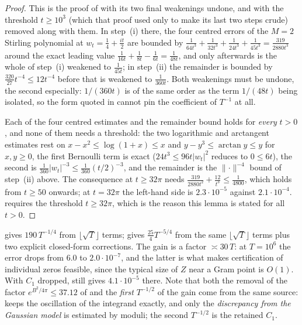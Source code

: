 \begin{proof}
\leanok
{}
This is the proof of  with its two final weakenings undone, and with the
threshold $t\ge10^{3}$ (which that proof used only to make its last two steps crude) removed
along with them.  In step~(i) there, the four centred errors of the $M=2$ Stirling polynomial at
$w_{t}=\tfrac14+\tfrac{it}2$ are bounded by
$\tfrac1{64t^{3}}+\tfrac1{32t^{3}}+\tfrac1{24t^{3}}+\tfrac1{45t^{3}}=\tfrac{319}{2880t^{3}}$
around the exact leading value $\tfrac1{16t}+\tfrac1{8t}-\tfrac1{6t}=\tfrac1{48t}$, and only
afterwards is the whole of step~(i) weakened to $\tfrac1{45t}$; in step~(ii) the remainder is
bounded by $\tfrac{320}{27}t^{-4}\le12t^{-4}$ before that is weakened to $\tfrac1{360t}$.  Both
weakenings must be undone, the second especially: $1/(360t)$ is of the same order as the term
$1/(48t)$ being isolated, so the form quoted in  cannot pin the coefficient of
$T^{-1}$ at all.

Each of the four centred estimates and the remainder bound holds for \emph{every} $t>0$, and none
of them needs a threshold: the two logarithmic and arctangent estimates rest on
$x-x^{2}\le\log(1+x)\le x$ and $y-y^{3}\le\arctan y\le y$ for $x,y\ge0$, the first Bernoulli term
is exact ($24t^{3}\le96t\lvert w_{t}\rvert^{2}$ reduces to $0\le6t$), the second is
$\tfrac1{360}\lvert w_{t}\rvert^{-3}\le\tfrac1{360}(t/2)^{-3}$, and the remainder is the
$\lVert\cdot\rVert^{-4}$ bound of step~(ii) above.  The consequence at $t\ge32\pi$ needs
$\tfrac{319}{2880t^{2}}+\tfrac{12}{t^{3}}\le\tfrac1{4800}$, which holds from $t\ge50$ onwards; at
$t=32\pi$ the left-hand side is $2.3\cdot10^{-5}$ against $2.1\cdot10^{-4}$.
 requires the threshold $t\ge32\pi$, which is the reason this lemma
is stated for all $t>0$.
\end{proof}

\begin{remark}
\label{rem:rsf_gain}
 gives $190\,T^{-1/4}$ from $\lfloor\sqrt T\rfloor$ terms;
 gives $\tfrac{25}4T^{-5/4}$ from the same $\lfloor\sqrt T\rfloor$
terms plus two explicit closed-form corrections.  The gain is a factor $\asymp30\,T$: at
$T=10^{6}$ the error drops from $6.0$ to $2.0\cdot10^{-7}$, and the latter is what makes
certification of individual zeros feasible, since the typical size of $Z$ near a Gram point is
$O(1)$.  With $C_{1}$ dropped,  still gives $4.1\cdot10^{-5}$ there.
Note that both the removal of the factor $e^{B^{2}/4\pi}\le37.12$ of
 and the \emph{first} $T^{-1/2}$ of the gain come from the same source:
 keeps the oscillation of the integrand exactly, and only the
\emph{discrepancy from the Gaussian model} is estimated by moduli; the second $T^{-1/2}$ is the
retained $C_{1}$.
\end{remark}

